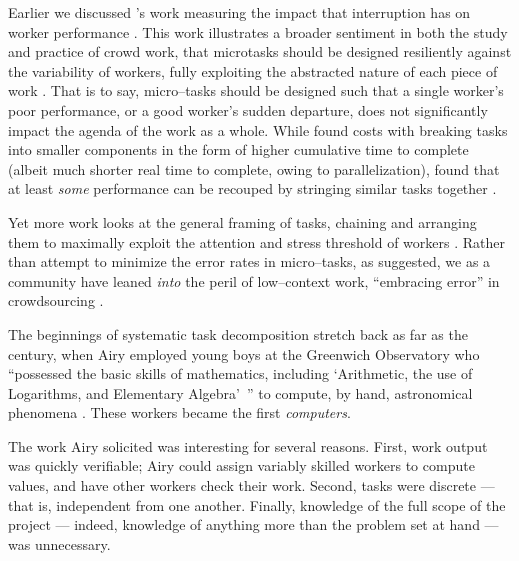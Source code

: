 \documentclass[trackingWork]{subfiles}
\begin{document}
Earlier we discussed \citeauthor{cheng2015break}'s work
measuring the impact that interruption has on worker performance
\cite{cheng2015break}.
This work illustrates a broader sentiment in
both the study and practice
of crowd work, that microtasks should be designed resiliently against the variability of workers,
fully exploiting the abstracted nature of each piece of work
\cite{interruptionIqbal,delayAndOrderLasecki,vaish2014low}.
That is to say, micro--tasks should be designed such that a single worker's poor performance,
or a good worker's sudden departure,
does not significantly impact the agenda of the work as a whole.
While \citeauthor{cheng2015break} found costs with breaking tasks into smaller components
in the form of higher cumulative time to complete
(albeit much shorter real time to complete, owing to parallelization),
\citeauthor{delayAndOrderLasecki} found that at least \textit{some} performance can be recouped by stringing 
similar tasks together
\cite[respectively]{cheng2015break,delayAndOrderLasecki}.


Yet more work looks at the general framing of tasks,
chaining and arranging them to maximally exploit
the attention and stress threshold %
of workers
\cite{Cai:2016:CRI:2858036.2858237}.
Rather than attempt to minimize the error rates in micro--tasks,
as \citeauthor{Kinnaird:2012:WTM:2389176.2389219} suggested,
we as a community have leaned \textit{into} the peril of
low--context work,
``embracing error'' in crowdsourcing
\cite{embracingErrorKrishna}.


\subsubsubsection{\pieceworkpers}
The beginnings of
systematic task decomposition
stretch back as far as the  century,
when Airy employed young boys at the Greenwich Observatory who
``possessed the basic skills of mathematics, including
`Arithmetic, the use of Logarithms, and Elementary Algebra'~''
to compute, by hand, astronomical phenomena
\cite{grier2013computers}.
These workers became the first \textit{computers}.

The work Airy solicited was interesting for several reasons.
First, work output was quickly verifiable;
Airy could assign variably skilled workers to compute values,
and have other workers check their work.
Second, tasks were discrete --- that is, independent from one another.
Finally, knowledge of the full scope of the project
--- indeed, knowledge of anything more than the problem set at hand ---
was unnecessary.
\end{document}
